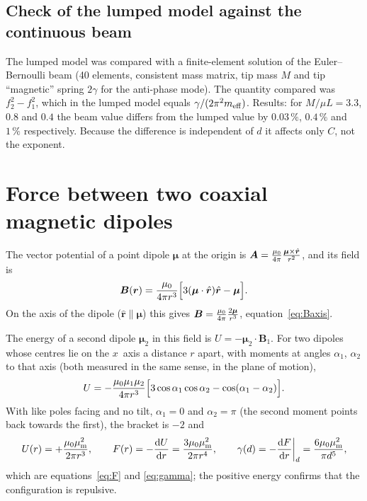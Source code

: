 \subsection{Check of the lumped model against the continuous beam}

The lumped model was compared with a finite-element solution of the Euler--Bernoulli beam (40 elements, consistent mass matrix, tip mass $M$ and tip ``magnetic'' spring $2\gamma$ for the anti-phase mode). The quantity compared was $f_2^2-f_1^2$, which in the lumped model equals $\gamma/(2\pi^2m_{\rm eff})$. Results: for $M/\mu L=3.3$, $0.8$ and $0.4$ the beam value differs from the lumped value by $0.03\,\%$, $0.4\,\%$ and $1\,\%$ respectively. Because the difference is independent of $d$ it affects only $C$, not the exponent.

\section{Force between two coaxial magnetic dipoles}\label{app:dipole}

The vector potential of a point dipole $\bm\mu$ at the origin is $\bm A=\frac{\mu_0}{4\pi}\frac{\bm\mu\times\hat{\bm r}}{r^2}$, and its field is \cite{griffiths}
\begin{equation}
\bm B(\bm r)=\frac{\mu_0}{4\pi r^3}\Big[3(\bm\mu\cdot\hat{\bm r})\hat{\bm r}-\bm\mu\Big].
\end{equation}
On the axis of the dipole ($\hat{\bm r}\parallel\bm\mu$) this gives $\bm B=\frac{\mu_0}{4\pi}\frac{2\bm\mu}{r^3}$, equation~\eqref{eq:Baxis}.

The energy of a second dipole $\bm\mu_2$ in this field is $U=-\bm\mu_2\cdot\bm B_1$. For two dipoles whose centres lie on the $x$~axis a distance $r$ apart, with moments at angles $\alpha_1$, $\alpha_2$ to that axis (both measured in the same sense, in the plane of motion),
\begin{equation}
U=-\frac{\mu_0\mu_1\mu_2}{4\pi r^3}\Big[3\cos\alpha_1\cos\alpha_2-\cos(\alpha_1-\alpha_2)\Big].
\label{eq:Ugeneral}
\end{equation}
With like poles facing and no tilt, $\alpha_1=0$ and $\alpha_2=\pi$ (the second moment points back towards the first), the bracket is $-2$ and
\begin{equation}
U(r)=+\frac{\mu_0\mu_{\mathrm m}^2}{2\pi r^3},\qquad
F(r)=-\frac{\mathrm{d} U}{\mathrm{d} r}=\frac{3\mu_0\mu_{\mathrm m}^2}{2\pi r^4},\qquad
\gamma(d)=-\frac{\mathrm{d} F}{\mathrm{d} r}\bigg|_d=\frac{6\mu_0\mu_{\mathrm m}^2}{\pi d^5},
\end{equation}
which are equations~\eqref{eq:F} and \eqref{eq:gamma}; the positive energy confirms that the configuration is repulsive.

